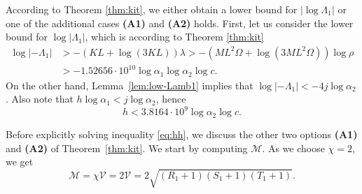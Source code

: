 \documentclass{amsart}
\theoremstyle{definition}
\begin{document}
According to Theorem \ref{thm:kit}, we either obtain a lower bound for $|\log \Lambda_1|$ or one of the
additional cases \textbf{(A1)} and \textbf{(A2)} holds. First, let us consider the lower bound for $\log |\Lambda_1|$, which
is according to Theorem \ref{thm:kit} 
\begin{align*}
\log|-\Lambda_1|&>- (KL + \log (3K L))\lambda>-(ML^2 \Omega + \log (3ML^2 \Omega))\log \rho\\
&>-1.52656\cdot 10^{10} \log \alpha_1\log \alpha_2 \log c.
\end{align*}
On the other hand, Lemma~\ref{lem:low-Lamb1} implies that $\log|-\Lambda_1|<-4j\log \alpha_2$. Also note that
$h\log \alpha_1< j\log \alpha_2$, hence 
\begin{equation}\label{eq:hh}
h<3.8164\cdot 10^{9}\log \alpha_2 \log c.
\end{equation}

Before explicitly solving inequality \eqref{eq:hh}, we discuss the other two options \textbf{(A1)}
and \textbf{(A2)} of Theorem~\ref{thm:kit}. We start by computing $\mathcal{M}$. As we choose $\chi =2$, we get 
$$
\mathcal{M} = \chi \mathcal{V} = 2\mathcal{V}=2\sqrt{(R_1+1)(S_1+1)(T_1+1)}.
$$
\end{document}
